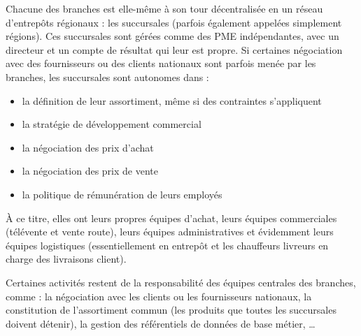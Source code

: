             Chacune des branches est elle-même à son tour décentralisée en un réseau d'entrepôts régionaux : les succursales (parfois également appelées simplement \og régions\fg).
            Ces succursales sont gérées comme des PME indépendantes, avec un directeur et un compte de résultat qui leur est propre.
            Si certaines négociation avec des fournisseurs ou des clients nationaux sont parfois menée par les branches, les succursales sont autonomes dans :
            \begin{itemize}
                \item{la définition de leur assortiment, même si des contraintes s'appliquent}
                \item{la stratégie de développement commercial}
                \item{la négociation des prix d'achat}
                \item{la négociation des prix de vente}
                \item{la politique de rémunération de leurs employés}
            \end{itemize}
            
            \`{A} ce titre, elles ont leurs propres équipes d'achat, leurs équipes commerciales (télévente et vente route), leurs équipes administratives et évidemment leurs équipes logistiques (essentiellement en entrepôt et les chauffeurs livreurs en charge des livraisons client).

            Certaines activités restent de la responsabilité des équipes centrales des branches, comme : la négociation avec les clients ou les fournisseurs nationaux, la constitution de l'assortiment commun (les produits que toutes les succursales doivent détenir), la gestion des référentiels de données de base métier, \dots
            
